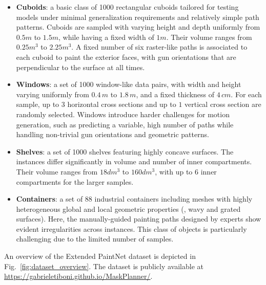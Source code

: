 \begin{itemize}[leftmargin=*,itemsep=2pt]
 \item \textbf{Cuboids}: a basic class of 1000 rectangular cuboids tailored for testing models under minimal generalization requirements and relatively simple path patterns. Cuboids are sampled with varying height and depth uniformly from $0.5m$ to $1.5m$, while having a fixed width of $1m$. Their volume ranges from $0.25m^3$ to $2.25m^3$. A fixed number of six raster-like paths is associated to each cuboid to paint the exterior faces, with gun orientations that are perpendicular to the surface at all times.

\item \textbf{Windows}: a set of 1000 window-like data pairs, with width and height varying uniformly from $0.4\,m$ to $1.8\,m$, and a fixed thickness of $4\,cm$. For each sample, up to $3$ horizontal cross sections and up to $1$ vertical cross section are randomly selected. Windows introduce harder challenges for motion generation, such as predicting a variable, high number of paths while handling non-trivial gun orientations and geometric patterns.

\item \textbf{Shelves}: a set of 1000 shelves featuring highly concave surfaces. The instances differ significantly in volume and number of inner compartments. Their volume ranges from $18dm^3$ to $160dm^3$, with up to 6 inner compartments for the larger samples.

\item \textbf{Containers}: a set of 88 industrial containers including meshes with highly heterogeneous global and local geometric properties (\eg, wavy and grated surfaces). Here, the manually-guided painting paths designed by experts show evident irregularities across instances. This class of objects is particularly challenging due to the limited number of samples.
\end{itemize}
%
An overview of the Extended PaintNet dataset is depicted in Fig.~\ref{fig:dataset_overview}.
The dataset is publicly available at \url{https://gabrieletiboni.github.io/MaskPlanner/}.
%